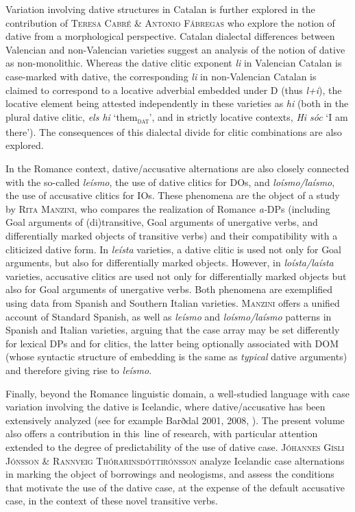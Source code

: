\documentclass[output=paper,modfonts,nonflat,colorlinks,citecolor=brown]{langsci/langscibook}
\begin{document}
Variation involving dative structures in Catalan is further explored in  the contribution of {\textsc{Teresa Cabré \& Antonio Fábregas}} who explore the notion of dative from a morphological perspective. Catalan dialectal differences between Valencian and non-Valencian varieties suggest an analysis of the notion of dative as non-monolithic. Whereas the dative clitic exponent {\textit{li}} in Valencian Catalan is case-marked with dative, the corresponding {\textit{li}} in non-Valencian Catalan is claimed to correspond to a locative adverbial embedded under D (thus {\textit{l+i}}), the locative element being attested independently in these varieties as {\textit{hi}} (both in the plural dative clitic, {\textit{els hi}} ‘them{\textsc{\textsubscript{dat}}}’, and in strictly locative contexts, {\textit{Hi sóc}} ‘I am there’). The consequences of this dialectal divide for clitic combinations are also explored.



In the Romance context, dative/accusative alternations are also closely connected with the so-called {\textit{leísmo}}, the use of dative clitics for DOs, and {\textit{loísmo/laísmo}}, the use of accusative clitics for IOs. These phenomena are the object of a study by {\textsc{Rita Manzini,} who} compares the realization of Romance {\textit{a-}}DPs (including Goal arguments of (di)transitive, Goal arguments of unergative verbs, and differentially marked objects of transitive verbs) and their compatibility with a cliticized dative form. In {\textit{leísta}} varieties, a dative clitic is used not only for Goal arguments, but also for differentially marked objects. However, in {\textit{loísta/laísta}} varieties, accusative clitics are used not only for differentially marked objects but also for Goal arguments of unergative verbs. Both phenomena are exemplified using data from Spanish and Southern Italian varieties. {\textsc{Manzini}} offers a unified account of Standard Spanish, as well as {\textit{leísmo}} and {\textit{loísmo/laísmo}} patterns in Spanish and Italian varieties, arguing that the case array may be set differently for lexical DPs and for clitics, the latter being optionally associated with DOM (whose syntactic structure of embedding is the same as {\textit{typical}} dative arguments) and therefore giving rise to {\textit{leísmo}}.



Finally, beyond the Romance linguistic domain, a well-studied language with case variation involving the dative is Icelandic, where dative/accusative has been extensively analyzed (see for example Barðdal 2001, 2008, \citealt{Svenonius2002,Maling2002,JónssonEythórsson2005}). The present volume also offers a contribution in this~line of research, with particular attention extended to the degree of predictability of the use of dative case. {\textsc{Jóhannes Gísli Jónsson \& Rannveig Thórarinsdóttirónsson}} analyze Icelandic case alternations in marking the object of borrowings and neologisms, and assess the conditions that motivate the use of the dative case, at the expense of the default accusative case, in the context of these novel transitive verbs.  
 

\sloppy\printbibliography[heading=subbibliography,notkeyword=this]
\end{document}

